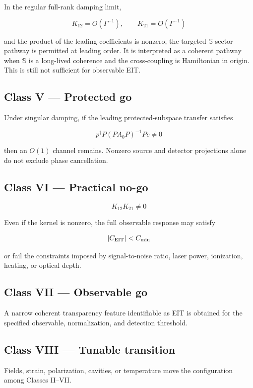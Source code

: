 \documentclass[
  10pt,
  a4paper,
]{article}
\begin{document}
In the regular full-rank damping limit,

\[
K_{12}=O(\Gamma^{-1}),
\qquad
K_{21}=O(\Gamma^{-1})
\]

and the product of the leading coefficients is nonzero, the targeted
\(\mathbb S\)-sector pathway is permitted at leading order. It is
interpreted as a coherent pathway when \(\mathbb S\) is a long-lived
coherence and the cross-coupling is Hamiltonian in origin. This is still
not sufficient for observable EIT.

\subsection{Class V --- Protected go}\label{class-v-protected-go}

Under singular damping, if the leading protected-subspace transfer
satisfies

\[
\boxed{
p^\dagger P(PA_0P)^{-1}Pc\neq0
}
\]

then an \(O(1)\) channel remains. Nonzero source and detector
projections alone do not exclude phase cancellation.

\subsection{Class VI --- Practical
no-go}\label{class-vi-practical-no-go}

\[
K_{12}K_{21}\neq0
\]

Even if the kernel is nonzero, the full observable response may satisfy

\[
|C_{\rm EIT}|<C_{\rm min}
\]

or fail the constraints imposed by signal-to-noise ratio, laser power,
ionization, heating, or optical depth.

\subsection{Class VII --- Observable go}\label{class-vii-observable-go}

A narrow coherent transparency feature identifiable as EIT is obtained
for the specified observable, normalization, and detection threshold.

\subsection{Class VIII --- Tunable
transition}\label{class-viii-tunable-transition}

Fields, strain, polarization, cavities, or temperature move the
configuration among Classes II--VII.
\end{document}
